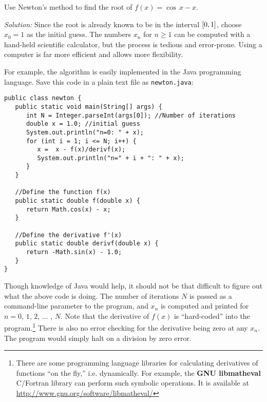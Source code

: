 \begin{exmp}\label{exmp:newt1}
\noindent Use Newton's method to find the root of $f(x) = \cos\,x - x$.\vspace{1mm}
\par\noindent\emph{Solution:} Since the root is already known to be in the
interval $\lbrack 0,1 \rbrack$, choose $x_0 = 1$ as the initial guess. The numbers
$x_n$ for $n \ge 1$ can be computed with a hand-held scientific calculator, but
the process is tedious and error-prone. Using a computer is far more efficient
and allows more flexibility.

For example, the algorithm is easily implemented in the Java programming
language. Save this code in a plain text file as \texttt{newton.java}:
\begin{lstlisting}[frame=single,framerule=0pt]
public class newton {
   public static void main(String[] args) {
      int N = Integer.parseInt(args[0]); //Number of iterations
      double x = 1.0; //initial guess
      System.out.println("n=0: " + x);
      for (int i = 1; i <= N; i++) {
         x =  x - f(x)/derivf(x);
         System.out.println("n=" + i + ": " + x);
      }
   }
 
   //Define the function f(x)
   public static double f(double x) {
      return Math.cos(x) - x;
   }

   //Define the derivative f'(x)
   public static double derivf(double x) {
      return -Math.sin(x) - 1.0;
   }
}
\end{lstlisting}
\noindent Though knowledge of Java would help, it should not be that difficult
to figure out what the above code is doing. The number of iterations $N$ is
passed as a command-line parameter to the program, and $x_n$ is computed and
printed for $n=0$, $1$, $2$, $\ldots$ , $N$. Note that the derivative of $f(x)$
is ``hard-coded'' into the program.\footnote{There are some programming
language libraries for
calculating derivatives of functions ``on the fly,'' i.e. dynamically. For
example, the \textbf{GNU libmatheval} C/Fortran library can perform such
symbolic operations. It is available at
\url{http://www.gnu.org/software/libmatheval/}}
There is also no error checking for the derivative being zero at any $x_n$.
The program would simply halt on a division by zero error.


\end{exmp}
